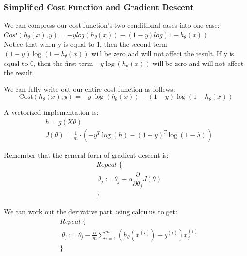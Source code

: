   \subsubsection{Simplified Cost Function and Gradient Descent}
  We can compress our cost function's two conditional cases into one case:\\
  $Cost(h_{\theta}(x),y)= -ylog(h_{\theta}(x))-(1-y)log(1-h_{\theta}(x))$\\

  
  Notice that when y is equal to 1, then the second term $(1-y)\log(1-h_\theta(x))$  will be zero and will not affect the result. If y is equal to 0, then the first term $-y \log(h_\theta(x))$ will be zero and will not affect the result.

  We can fully write out our entire cost function as follows:
  \begin{equation}
    \mathrm{Cost}(h_\theta(x),y) = - y \; \log(h_\theta(x)) - (1 - y) \log(1 - h_\theta(x))
  \end{equation}

  A vectorized implementation is:\\
  \begin{equation}
    \begin{aligned}
      & h = g(X\theta)\\
      & J(\theta) = \frac{1}{m} \cdot \left(-y^{T}\log(h)-(1-y)^{T}\log(1-h)\right)
    \end{aligned}    
  \end{equation}

  Remember that the general form of gradient descent is:
  \begin{equation}
    \begin{aligned}
      & Repeat \; \lbrace \\
      & \; \theta_j := \theta_j - \alpha \dfrac{\partial}{\partial \theta_j}J(\theta) \\
      & \rbrace\end{aligned}
  \end{equation}

  We can work out the derivative part using calculus to get:\\
  \begin{equation}
    \begin{aligned}
      & Repeat \; \lbrace \\
      & \; \theta_j := \theta_j - \frac{\alpha}{m} \sum_{i=1}^m (h_\theta(x^{(i)}) - y^{(i)}) x_j^{(i)} \\
      & \rbrace
    \end{aligned}
  \end{equation}

